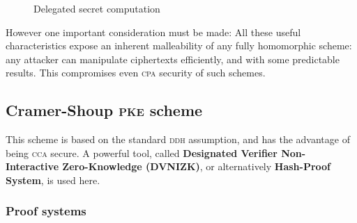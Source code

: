 \begin{figure}[h!]
    \centering
    \sdinit{}
    \caption{Delegated secret computation}
    \label{seq:delseccomp}
\end{figure}

However one important consideration must be made: All these useful characteristics expose an inherent malleability of any fully homomorphic scheme: any attacker can manipulate ciphertexts efficiently, and with some predictable results. This compromises even \textsc{cpa} security of such schemes.

\subsection{Cramer-Shoup \textsc{pke} scheme}

This scheme is based on the standard \textsc{ddh} assumption, and has the advantage of being \textsc{cca} secure. A powerful tool, called \textbf{Designated Verifier Non-Interactive Zero-Knowledge (DVNIZK)}, or alternatively \textbf{Hash-Proof System}, is used here.

\subsubsection{Proof systems}

